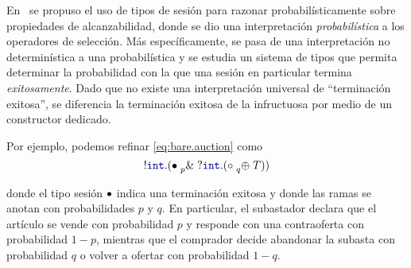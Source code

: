 En~\cite{DBLP:conf/concur/InversoMPTT20} se propuso el uso de tipos de sesión
para razonar probabilísticamente sobre propiedades de alcanzabilidad, donde se
dio una interpretación \emph{probabilística} a los operadores de selección. Más
específicamente, se pasa de una interpretación no determinística a una
probabilística y se estudia un sistema de tipos que permita determinar la
probabilidad con la que una sesión en particular termina \emph{exitosamente}.
Dado que no existe una interpretación universal de ``terminación exitosa'', se
diferencia la terminación exitosa de la infructuosa por medio de un constructor
dedicado.

Por ejemplo, podemos refinar \eqref{eq:bare.auction} como
\begin{equation}
    \label{eq:refined.auction}
    \cout\tint\parens{
        \tbranch[p]\tdone{
            \cin\tint\parens{
                \tchoice[q]\tend\T
            }
        }
    }
\end{equation}

donde el tipo sesión ${\bullet}$ indica una terminación exitosa y donde las
ramas  se anotan con probabilidades $p$ y $q$. En particular, el subastador
declara que el artículo se vende con probabilidad $p$ y  responde con una
contraoferta con probabilidad $1-p$, mientras que el comprador decide abandonar
la subasta con probabilidad $q$ o volver a ofertar  con probabilidad $1-q$.
